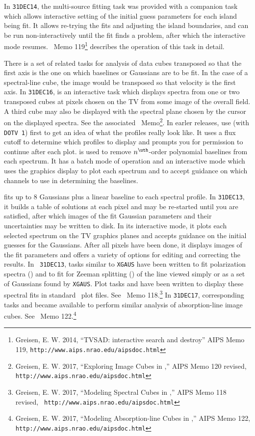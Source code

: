      In {\tt 31DEC14}, the multi-source fitting task {\tt {}}
was provided with a companion task {\tt {}} which allows
interactive setting of the initial guess parameters for each island
being fit.  It allows re-trying the fits and adjusting the island
boundaries, and can be run non-interactively until the fit finds a
problem, after which the interactive mode resumes.  \AIPS\ Memo
119\footnote{Greisen, E. W. 2014, ``TVSAD: interactive search and
destroy'' AIPS Memo 119, {\tt http://www.aips.nrao.edu/aipsdoc.html}}
describes the operation of this task in detail.

     There is a set of related tasks for analysis of data cubes
transposed so that the first axis is the one on which baselines or
Gaussians are to be fit.  In the case of a spectral-line cube, the
image would be transposed so that velocity is the first axis.
In {\tt 31DEC16}, {\tt {}} is an interactive task which
displays spectra from one or two transposed cubes at pixels chosen on
the TV from some image of the overall field.  A third cube may also be
displayed with the spectral plane chosen by the cursor on the
displayed spectra.  See the associated \AIPS\ Memo\footnote{Greisen,
E. W. 2017, ``Exploring Image Cubes in \AIPS,'' AIPS Memo 120 revised,
{\tt http://www.aips.nrao.edu/aipsdoc.html}}.  In earler releases, use
{\tt {}} (with {\tt DOTV 1}) first to get an idea of what
the profiles really look like.  It uses a flux cutoff to determine
which profiles to display and prompts you for permission to continue
after each plot.  {\tt {}} is used to remove
$n^{\uth}$-order polynomial baselines from each spectrum.  It has a
batch mode of operation and an interactive mode which uses the
graphics display to plot each spectrum and to accept guidance on
which channels to use in determining the baselines.

{\tt {}} fits up to 8 Gaussians plus a linear baseline to
each spectral profile.  In {\tt 31DEC13}, it builds a table of
solutions at each pixel and may be re-started until you are satisfied,
after which images of the fit Gaussian parameters and their
uncertainties may be written to disk.  In its interactive mode, it
plots each selected spectrum on the TV graphics planes and accepts
guidance on the initial guesses for the Gaussians.  After all pixels
have been done, it displays images of the fit parameters and offers a
variety of options for editing and correcting the results.  In {\tt
31DEC13}, tasks similar to {\tt XGAUS} have been written to fit
polarization spectra ({\tt {}}) and to fit for Zeeman
splitting ({\tt {}}) of the line viewed simply or as a set
of Gaussians found by {\tt XGAUS}\@.  Plot tasks {\tt {}}
and {\tt {}} have been written to display these spectral
fits in standard \AIPS\ plot files.  See \AIPS\ Memo
118.\footnote{Greisen, E. W. 2017, ``Modeling Spectral Cubes in
\AIPS,'' AIPS Memo 118 revised, {\tt
http://www.aips.nrao.edu/aipsdoc.html}}  In {\tt 31DEC17},
corresponding tasks {\tt {}} and {\tt {}} became
available to perform similar analysis of absorption-line image cubes.
See \AIPS\ Memo 122.\footnote{Greisen, E. W. 2017, ``Modeling
Absorption-line Cubes in \AIPS,'' AIPS Memo 122, {\tt
http://www.aips.nrao.edu/aipsdoc.html}}

